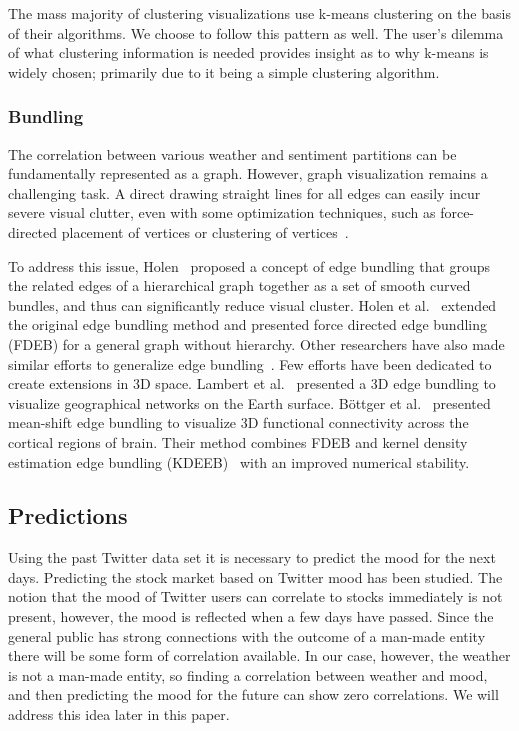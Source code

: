 \documentclass[journal]{vgtc}                %
\begin{document}
The mass majority of clustering visualizations use k-means clustering on the basis of their algorithms. \cite{li2014nasty,weber2001visualizing} We choose to follow this pattern as well. The user's dilemma of what clustering information is needed provides insight as to why k-means is widely chosen; primarily due to it being a simple clustering algorithm. \cite{weber2001visualizing}

\subsubsection{Bundling}
The correlation between various weather and sentiment partitions can be fundamentally represented as a graph. However, graph visualization remains a challenging task. A direct drawing straight lines for all edges can easily incur severe visual clutter, even with some optimization techniques, such as force-directed placement of vertices or clustering of vertices~\cite{KAUFMANN2001}.

To address this issue, Holen~\cite{holten2006hierarchical} proposed a concept of edge bundling that groups the related edges of a hierarchical graph together as a set of smooth curved bundles, and thus can significantly reduce visual cluster. Holen et al.~\cite{holten2009force} extended the original edge bundling method and presented force directed edge bundling (FDEB) for a general graph without hierarchy. Other researchers have also made similar efforts to generalize edge bundling~\cite{cui2008geometry,telea2010image,ersoy2011skeleton,gansner2011multilevel}. Few efforts have been dedicated to create extensions in 3D space. Lambert et al.~\cite{5571244} presented a 3D edge bundling to visualize geographical networks on the Earth surface. B\"{o}ttger et al.~\cite{bottger2014three} presented mean-shift edge bundling to visualize 3D functional connectivity across the cortical regions of brain. Their method combines FDEB and kernel density estimation edge bundling
(KDEEB)~\cite{hurter2012graph} with an improved numerical stability.

\subsection{Predictions}

Using the past Twitter data set it is necessary to predict the mood for the next days. Predicting the stock market based on Twitter mood has been studied. \cite{woodring2009multiscale} The notion that the mood of Twitter users can correlate to stocks immediately is not present, however, the mood is reflected when a few days have passed. Since the general public has strong connections with the outcome of a man-made entity there will be some form of correlation available. In our case, however, the weather is not a man-made entity, so finding a correlation between weather and mood, and then predicting the mood for the future can show zero correlations. We will address this idea later in this paper.
\end{document}
